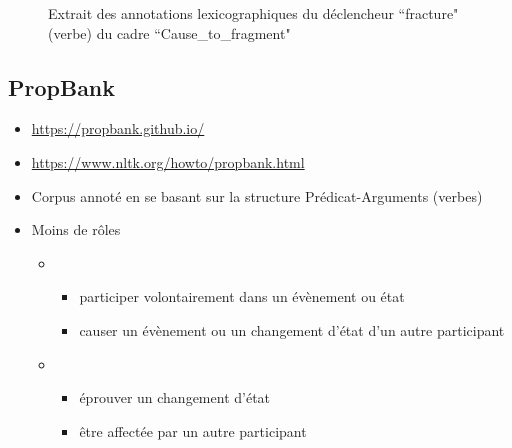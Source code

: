 \documentclass{KodeBook}
\begin{document}
\begin{figure}
\begin{itemize}
	\end{itemize}
	
	\caption{Extrait des annotations lexicographiques du déclencheur ``fracture" (verbe) du cadre ``Cause\_to\_fragment"}
\end{figure}

\subsection{PropBank}

\begin{itemize}
	\item {\scriptsize \url{https://propbank.github.io/}}
	\item {\scriptsize \url{https://www.nltk.org/howto/propbank.html}}
	\item Corpus annoté en se basant sur la structure Prédicat-Arguments (verbes)
	\item Moins de rôles 
	\begin{itemize}
		\item {}
		\begin{itemize}
			\item participer volontairement dans un évènement ou état
			\item causer un évènement ou un changement d'état d'un autre participant
		\end{itemize}
		\item {}
		\begin{itemize}
			\item éprouver un changement d'état
			\item être affectée par un autre participant
		\end{itemize}
	\end{itemize}
\end{itemize}
\end{document}
